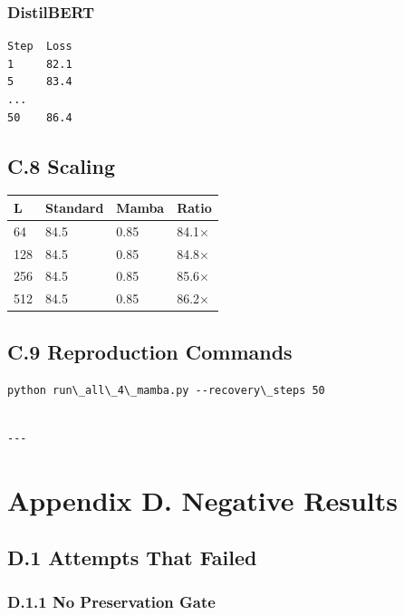 \subsubsection{DistilBERT}
\begin{lstlisting}
Step  Loss
1     82.1
5     83.4
...
50    86.4
\end{lstlisting}

\subsection{C.8 Scaling}

\begin{table}[H]
\centering
\small
\begin{tabular}{llll}
\toprule
\textbf{L} & \textbf{Standard} & \textbf{Mamba} & \textbf{Ratio} \\
\midrule
64 & 84.5 & 0.85 & 84.1$\times$ \\
128 & 84.5 & 0.85 & 84.8$\times$ \\
256 & 84.5 & 0.85 & 85.6$\times$ \\
512 & 84.5 & 0.85 & 86.2$\times$ \\
\bottomrule
\end{tabular}
\end{table}

\subsection{C.9 Reproduction Commands}

\begin{lstlisting}
python run\_all\_4\_mamba.py --recovery\_steps 50
\end{lstlisting}
\begin{lstlisting}

---
\end{lstlisting}

\section{Appendix D. Negative Results}

\subsection{D.1 Attempts That Failed}

\subsubsection{D.1.1 No Preservation Gate}

